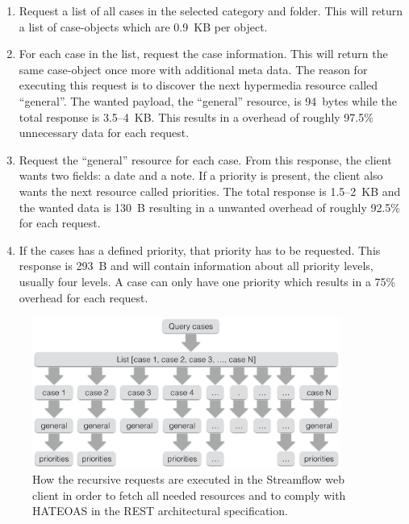 \documentclass{cslthse-msc}
\begin{document}
\begin{enumerate}
	\item Request a list of all cases in the selected category and folder. This will return a list of case-objects which are 0.9~KB per object.
	\item For each case in the list, request the case information. This will return the same case-object once more with additional meta data. The reason for executing this request is to discover the next hypermedia resource called \enquote{general}. The wanted payload, the \enquote{general} resource, is 94~bytes while the total response is 3.5--4~KB. This results in a overhead of roughly 97.5\% unnecessary data for each request.
	\item Request the \enquote{general} resource for each case. From this response, the client wants two fields: a date and a note. If a priority is present, the client also wants the next resource called priorities. The total response is 1.5--2~KB and the wanted data is 130~B resulting in a unwanted overhead of roughly 92.5\% for each request.
	\item If the cases has a defined priority, that priority has to be requested. This response is 293~B and will contain information about all priority levels, usually four levels. A case can only have one priority which results in a 75\% overhead for each request.
\end{enumerate}

\begin{figure}[H]
  \centering
    \begin{center}
      \includegraphics[width=0.9\textwidth]{images/streamflow_cases.png}
    \end{center}
  \caption{How the recursive requests are executed in the Streamflow web client in order to fetch all needed resources and to comply with HATEOAS in the REST architectural specification.}
\end{figure}
\end{document}
